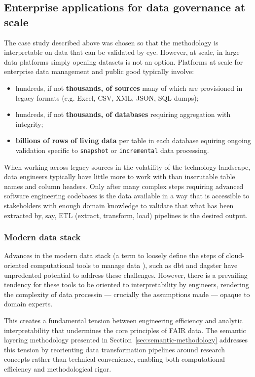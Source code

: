 \documentclass{article}
\begin{document}
\subsection{Enterprise applications for data governance at scale}

The case study described above was chosen so that the methodology is interpretable on data that can be validated by eye. However, at scale, in large data platforms simply opening datasets is not an option. Platforms at scale for enterprise data management and public good typically involve:

\begin{itemize}
  \item hundreds, if not  \textbf{thousands, of sources} many of which are provisioned in legacy formats (e.g. Excel, CSV, XML, JSON, SQL dumps);
  \item hundreds, if not \textbf{thousands, of databases} requiring aggregation with integrity;
  \item \textbf{billions of rows of living data} per table in each database equiring ongoing validation specific to \texttt{snapshot} or \texttt{incremental} data processing.
\end{itemize}

When working across legacy sources in the volatility of the technology landscape, data engineers typically have little more to work with than inscrutable table names and column headers. Only after many complex steps requiring advanced software engineering codebases is the data available in a way that is accessible to stakeholders with enough domain knowledge to validate that what has been extracted by, say, ETL (extract, transform, load) pipelines is the desired output. 

\subsubsection{Modern data stack}

Advances in the modern data stack (a term to loosely define the steps of cloud-oriented computational tools to manage data \cite{modern_data_stack_airbyte}), such as dbt \cite{dbt_core} and dagster \cite{dagster} have unpredented potential to address these challenges. However, there is a prevailing tendency for these tools to be oriented to interpretability by engineers, rendering the complexity of data processin --- crucially the assumptions made --- opaque to domain experts. 

This creates a fundamental tension between engineering efficiency and analytic interpretability that undermines the core principles of FAIR data. The semantic layering methodology presented in Section~\ref{sec:semantic-methodology} addresses this tension by reorienting data transformation pipelines around research concepts rather than technical convenience, enabling both computational efficiency and methodological rigor.
\end{document}
